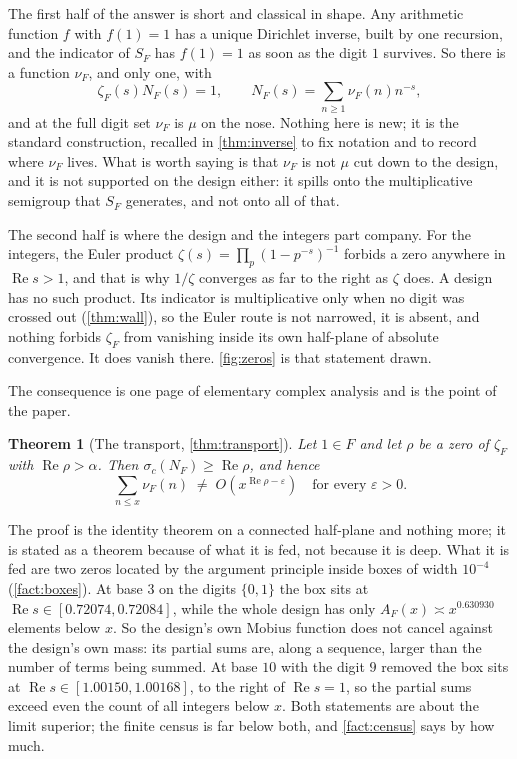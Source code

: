 \documentclass[11pt]{amsart}
\newtheorem{theorem}{Theorem}[section]
\theoremstyle{definition}
\theoremstyle{remark}
\begin{document}
The first half of the answer is short and classical in shape. Any arithmetic function $f$ with $f(1) = 1$ has a unique Dirichlet inverse, built by one recursion, and the indicator of $S_{F}$ has $f(1) = 1$ as soon as the digit $1$ survives. So there is a function $\nu_{F}$, and only one, with
\[
  \zeta_{F}(s) N_{F}(s) = 1, \qquad N_{F}(s) = \sum_{n \ge 1} \nu_{F}(n) n^{-s},
\]
and at the full digit set $\nu_{F}$ is $\mu$ on the nose. Nothing here is new; it is the standard construction, recalled in \cref{thm:inverse} to fix notation and to record where $\nu_{F}$ lives. What is worth saying is that $\nu_{F}$ is not $\mu$ cut down to the design, and it is not supported on the design either: it spills onto the multiplicative semigroup that $S_{F}$ generates, and not onto all of that.

The second half is where the design and the integers part company. For the integers, the Euler product $\zeta(s) = \prod_{p} (1 - p^{-s})^{-1}$ forbids a zero anywhere in $\operatorname{Re} s > 1$, and that is why $1/\zeta$ converges as far to the right as $\zeta$ does. A design has no such product. Its indicator is multiplicative only when no digit was crossed out (\cref{thm:wall}), so the Euler route is not narrowed, it is absent, and nothing forbids $\zeta_{F}$ from vanishing inside its own half-plane of absolute convergence. It does vanish there. \cref{fig:zeros} is that statement drawn.

The consequence is one page of elementary complex analysis and is the point of the paper.

\begin{theorem}[The transport, \cref{thm:transport}]
Let $1 \in F$ and let $\rho$ be a zero of $\zeta_{F}$ with $\operatorname{Re}\rho > \alpha$. Then $\sigma_{c}(N_{F}) \ge \operatorname{Re}\rho$, and hence
\[
  \sum_{n \le x} \nu_{F}(n) \;\ne\; O\!\left(x^{\operatorname{Re}\rho - \varepsilon}\right) \quad \text{for every } \varepsilon > 0.
\]
\end{theorem}

The proof is the identity theorem on a connected half-plane and nothing more; it is stated as a theorem because of what it is fed, not because it is deep. What it is fed are two zeros located by the argument principle inside boxes of width $10^{-4}$ (\cref{fact:boxes}). At base $3$ on the digits $\{0,1\}$ the box sits at $\operatorname{Re} s \in [0.72074, 0.72084]$, while the whole design has only $A_{F}(x) \asymp x^{0.630930}$ elements below $x$. So the design's own Mobius function does not cancel against the design's own mass: its partial sums are, along a sequence, larger than the number of terms being summed. At base $10$ with the digit $9$ removed the box sits at $\operatorname{Re} s \in [1.00150, 1.00168]$, to the right of $\operatorname{Re} s = 1$, so the partial sums exceed even the count of all integers below $x$. Both statements are about the limit superior; the finite census is far below both, and \cref{fact:census} says by how much.
\end{document}
